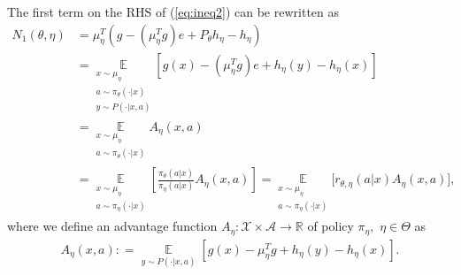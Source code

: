 \documentclass[11pt]{article}
\newcommand{\R}{\mathbb{R}}
\newcommand{\E}{\mathbb{E}}
\newcommand{\X}{\mathcal{X}}
\newcommand{\A}{\mathcal{A}}
\theoremstyle{definition}
\numberwithin{equation}{section}
\begin{document}
The first term on the RHS of   (\ref{eq:ineq2}) can be rewritten as
\begin{align}\label{eq:MA}
N_1(\theta, \eta) & =  \mu_{\eta}^T(g -(\mu_\eta^Tg) e   +P_{\theta}h_{\eta} - h_{\eta} ) \nonumber \\
 & =  \underset{\substack{ x\sim \mu_{\eta}\\ a\sim \pi_{\theta}(\cdot|x) \\ y\sim P(\cdot|x, a)}  }{\E} \left[    g(x ) -(\mu_\eta^Tg) e   + h_{\eta}(y) - h_{\eta}(x)   \right]  \nonumber\\                  &
                    =  \underset{\substack{ x\sim \mu_{\eta}\\ a\sim \pi_{\theta}(\cdot|x)  }  }{\E} A_{\eta} (x, a)\nonumber\\
                  & =  \underset{\substack{ x\sim \mu_{\eta}\\ a\sim \pi_{\eta}(\cdot|x)  }  }{\E} \left[ \frac{\pi_{\theta}(a|x)}{\pi_{\eta}(a|x)}A_{ \eta} (x, a) \right]
 =  \underset{\substack{ x\sim \mu_{\eta}\\ a\sim \pi_{\eta}(\cdot|x)  }  }{\E}\Big[  r_{\theta, \eta}(a|x)A_{\eta} (x, a)\Big],
\end{align}
where we define an advantage function $A_{\eta}:\X\times \A\rightarrow \R$ of policy $\pi_\eta, $ $\eta\in \Theta$ as
\begin{align}\label{eq:A}
	A_{\eta}(x, a): =   \underset{\substack{ y\sim P(\cdot|x, a)}  }{\E} \left[g(x) - \mu_\eta^T g + h_{\eta} (y) -h_{\eta} (x) \right].
\end{align}
\end{document}
